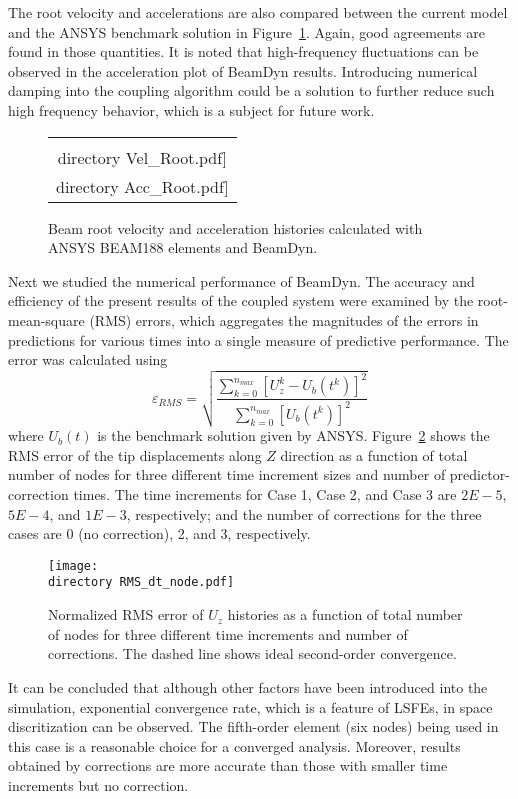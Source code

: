 \documentclass{aiaa-tc}
\def\directory{EPSF/}
\begin{document}
The root velocity and accelerations are also compared between the current model and the ANSYS benchmark solution in Figure~\ref{fig:E1VelAcc}. 
Again, good agreements are found in those quantities. 
It is noted that high-frequency fluctuations can be observed in the acceleration plot of BeamDyn results. 
Introducing numerical damping into the coupling algorithm could be a solution to further reduce such high frequency behavior, which is a subject for future work.

 \begin{figure}
    \centering
    \begin{tabular}{c}
    \subfloat[Root Velocity]{\label{fig:E1VelRoot}\texttt{[image: \\directory  Vel\_Root.pdf]}} \qquad
\subfloat[Root Acceleration]{\label{fig:E1AccRoot}\texttt{[image: \\directory  Acc\_Root.pdf]}}\\
\end{tabular}
\caption{Beam root velocity and acceleration histories calculated with ANSYS BEAM188 elements and BeamDyn.}
\label{fig:E1VelAcc}
\end{figure} 

Next we studied the numerical performance of BeamDyn. The accuracy and efficiency of the present results of the coupled system were examined by the root-mean-square (RMS) errors, which aggregates the magnitudes of the errors in predictions for various times into a single measure of predictive performance. The error was calculated using
\begin{equation}
\varepsilon_{RMS}=\sqrt{\frac{\sum_{k=0}^{n_{max}}[U_z^k-U_b(t^k)]^2}{\sum_{k=0}^{n_{max}}[U_b(t^k)]^2}}
\label{RMSdefi}
\end{equation} 
where $U_b(t)$ is the benchmark solution given by ANSYS. Figure~\ref{fig:ConvDTNode} shows the RMS error of the tip displacements along $Z$ direction as a function of total number of nodes for three different time increment sizes and number of predictor-correction times. The time increments for Case 1, Case 2, and Case 3 are $2E-5$, $5E-4$, and $1E-3$, respectively; and the number of corrections for the three cases are 0 (no correction), 2, and 3, respectively.
\begin{figure}
\centering
\texttt{[image: \\directory RMS\_dt\_node.pdf]}
\caption{Normalized RMS error of $U_z$ histories as a function of total number of nodes for three different time increments and number of corrections. The dashed line shows ideal second-order convergence.} 
\label{fig:ConvDTNode}
\end{figure}
It can be concluded that although other factors have been introduced into the simulation, exponential convergence rate, which is a feature of LSFEs, in space discritization can be observed. The fifth-order element (six nodes) being used in this case is a reasonable choice for a converged analysis. Moreover, results obtained by corrections are more accurate than those with smaller time increments but no correction.
\end{document}

